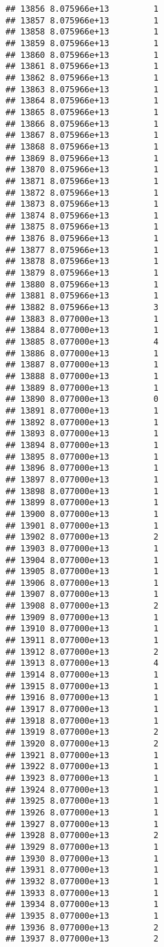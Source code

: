 \documentclass[
]{article}
\begin{document}
\begin{verbatim}
## 13856 8.075966e+13         1
## 13857 8.075966e+13         1
## 13858 8.075966e+13         1
## 13859 8.075966e+13         1
## 13860 8.075966e+13         1
## 13861 8.075966e+13         1
## 13862 8.075966e+13         1
## 13863 8.075966e+13         1
## 13864 8.075966e+13         1
## 13865 8.075966e+13         1
## 13866 8.075966e+13         1
## 13867 8.075966e+13         1
## 13868 8.075966e+13         1
## 13869 8.075966e+13         1
## 13870 8.075966e+13         1
## 13871 8.075966e+13         1
## 13872 8.075966e+13         1
## 13873 8.075966e+13         1
## 13874 8.075966e+13         1
## 13875 8.075966e+13         1
## 13876 8.075966e+13         1
## 13877 8.075966e+13         1
## 13878 8.075966e+13         1
## 13879 8.075966e+13         1
## 13880 8.075966e+13         1
## 13881 8.075966e+13         1
## 13882 8.075966e+13         3
## 13883 8.077000e+13         1
## 13884 8.077000e+13         1
## 13885 8.077000e+13         4
## 13886 8.077000e+13         1
## 13887 8.077000e+13         1
## 13888 8.077000e+13         1
## 13889 8.077000e+13         1
## 13890 8.077000e+13         0
## 13891 8.077000e+13         1
## 13892 8.077000e+13         1
## 13893 8.077000e+13         1
## 13894 8.077000e+13         1
## 13895 8.077000e+13         1
## 13896 8.077000e+13         1
## 13897 8.077000e+13         1
## 13898 8.077000e+13         1
## 13899 8.077000e+13         1
## 13900 8.077000e+13         1
## 13901 8.077000e+13         1
## 13902 8.077000e+13         2
## 13903 8.077000e+13         1
## 13904 8.077000e+13         1
## 13905 8.077000e+13         1
## 13906 8.077000e+13         1
## 13907 8.077000e+13         1
## 13908 8.077000e+13         2
## 13909 8.077000e+13         1
## 13910 8.077000e+13         1
## 13911 8.077000e+13         1
## 13912 8.077000e+13         2
## 13913 8.077000e+13         4
## 13914 8.077000e+13         1
## 13915 8.077000e+13         1
## 13916 8.077000e+13         1
## 13917 8.077000e+13         1
## 13918 8.077000e+13         1
## 13919 8.077000e+13         2
## 13920 8.077000e+13         2
## 13921 8.077000e+13         1
## 13922 8.077000e+13         1
## 13923 8.077000e+13         1
## 13924 8.077000e+13         1
## 13925 8.077000e+13         1
## 13926 8.077000e+13         1
## 13927 8.077000e+13         1
## 13928 8.077000e+13         2
## 13929 8.077000e+13         1
## 13930 8.077000e+13         1
## 13931 8.077000e+13         1
## 13932 8.077000e+13         1
## 13933 8.077000e+13         1
## 13934 8.077000e+13         1
## 13935 8.077000e+13         1
## 13936 8.077000e+13         2
## 13937 8.077000e+13         2

\end{verbatim}
\end{document}
